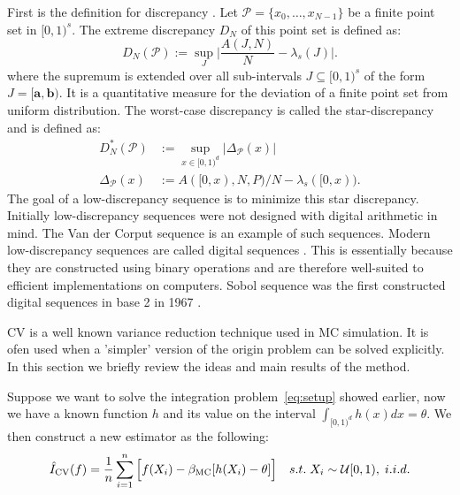 First is the definition for discrepancy \cite{dick2010digital}.
Let $\mathscr{P} =\{x_0,\dots,x_{N −1}\}$ be a finite point set in $[0, 1)^s$.
The extreme discrepancy $D_N$ of this point set is defined as:
\[
    D_N(\mathscr{P}) := \sup_{J}\Big| \frac{A(J, N)}{N}-\lambda_s(J)\Big|.
\]
where the supremum is extended over all sub-intervals $J \subseteq [0, 1)^s$ of the form $J=[\mathbf{a},\mathbf{b})$.
It is a quantitative measure for the deviation of a finite point set from uniform distribution.
The worst-case discrepancy is called the star-discrepancy and is defined as:
\begin{align*}
    D^*_N(\mathscr{P})&:=\sup_{x\in[0,1)^d}|\Delta_{\mathscr{P}}(x)|\\
    \Delta_{\mathscr{P}}(x)&:=A([0,x),N,P)/N - \lambda_s([0,x)).
\end{align*}
The goal of a low-discrepancy sequence is to minimize this star discrepancy.
Initially low-discrepancy sequences were not designed with digital arithmetic in mind. 
The Van der Corput sequence \cite{halton1960efficiency} is an example of such sequences.
Modern low-discrepancy sequences are called digital sequences \cite{l2005recent}. This is essentially because they are constructed using binary operations and are therefore well-suited to efficient implementations on computers.
Sobol sequence was the first constructed digital sequences in base 2 in 1967 \cite{dick2010digital}.


CV is a well known variance reduction technique used in MC simulation. 
It is ofen used when a 'simpler' version of the origin problem can be solved explicitly. In this section we briefly review the ideas and main results of the method.
 
Suppose we want to solve the integration problem~\eqref{eq:setup} showed earlier, now we have a known function $h$ and its value on the interval
$\int_{[0,1)^d} h(x)dx = \theta$. 
We then construct a new estimator as the following:
\[\hat{I}_{\mathrm{CV}}(f)=\frac{1}{n}\sum_{i=1}^{n}\Big[ f(X_i)-\beta_{\mathrm{MC}}[h(X_i)-\theta] \Big] \quad s.t.\; X_i\sim \mathcal{U}[0,1), \; i.i.d.\]

